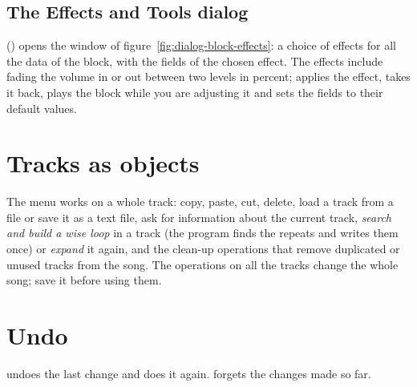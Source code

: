 \subsection{The Effects and Tools dialog}

 () opens the window of figure~\ref{fig:dialog-block-effects}: a
choice of effects for all the data of the block, with the fields of the chosen effect. The effects include fading the volume in
or out between two levels in percent;  applies the effect,  takes it back,  plays the
block while you are adjusting it and  sets the fields to their default values.


\section{Tracks as objects}

The  menu works on a whole track: copy, paste, cut, delete, load a track from a file or save it as a
text file, ask for information about the current track, \emph{search and build a wise loop} in a track (the program finds the
repeats and writes them once) or \emph{expand} it again, and the clean-up operations that remove duplicated or unused
tracks from the song. The operations on all the tracks change the whole song; save it before using them.

\section{Undo}

 undoes the last change and  does it again. 
forgets the changes made so far.
